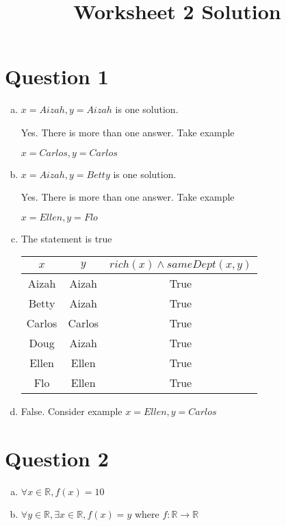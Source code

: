 \documentclass[12pt]{article}
\begin{document}
\title{Worksheet 2 Solution}
\maketitle

\section*{Question 1}

\begin{enumerate}[a)]
    \item
        $x = Aizah, y = Aizah$ is one solution.

        \bigskip

        Yes. There is more than one answer. Take example

        $x = Carlos, y = Carlos$

    \bigskip

    \item
        $x = Aizah, y = Betty$ is one solution.

        \bigskip

        Yes. There is more than one answer. Take example

        $x = Ellen, y = Flo$

    \item
        The statement is true

        \begin{tabular}{ c | c | c }
            $x$ & $y$ & $rich(x) \land sameDept(x,y)$ \\
            \hline
            Aizah & Aizah & True \\
            \hline
            Betty & Aizah & True \\
            \hline
            Carlos & Carlos & True \\
            \hline
            Doug & Aizah & True \\
            \hline
            Ellen & Ellen & True \\
            \hline
            Flo & Ellen & True \\
            \hline
        \end{tabular}

    \item
        False. Consider example $x = Ellen, y = Carlos$

\end{enumerate}

\section*{Question 2}

\begin{enumerate}[a)]
    \item
        $\forall x \in \mathbb{R}, f(x) = 10$

    \item
        $\forall y \in \mathbb{R}, \exists x \in \mathbb{R}, f(x) = y$ where $f: \mathbb{R} \to \mathbb{R}$

\end{enumerate}
\end{document}
